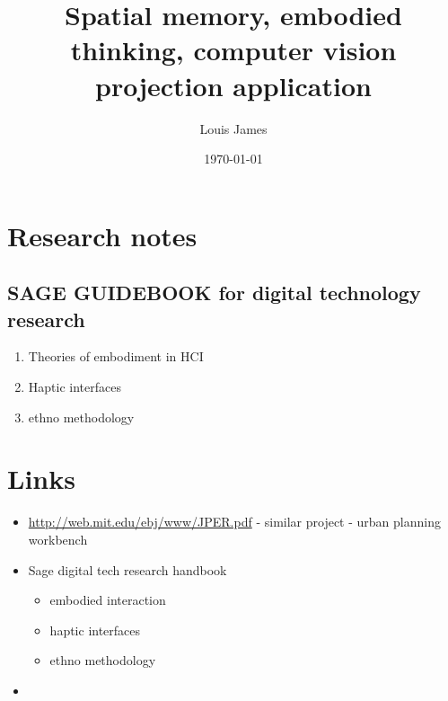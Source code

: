 \documentclass[11pt]{article}
\author{Louis James}
\date{\today}
\title{Spatial memory, embodied thinking, computer vision projection application}
\begin{document}
\maketitle
\tableofcontents


\section{Research notes}
\label{sec:orgd24a236}
\subsection{SAGE GUIDEBOOK for digital technology research}
\label{sec:orgb44cf5c}
\begin{enumerate}
\item Theories of embodiment in HCI
\label{sec:orgb6ed5a5}
\item Haptic interfaces
\label{sec:org160a842}
\item ethno methodology
\label{sec:orgc7c94a7}
\end{enumerate}
\section{Links}
\label{sec:org2dea7c2}
\begin{itemize}
\item \url{http://web.mit.edu/ebj/www/JPER.pdf} - similar project - urban planning workbench
\item Sage digital tech research handbook
\begin{itemize}
\item embodied interaction
\item haptic interfaces
\item ethno methodology
\end{itemize}
\item 
\end{itemize}
\end{document}
